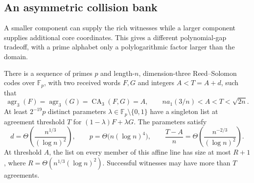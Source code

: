 \subsection{An asymmetric collision bank}
\label{subsec:asymmetric-collision-bank}

A smaller component can supply the rich witnesses while a larger component
supplies additional core coordinates.  This gives a different polynomial-gap
tradeoff, with a prime alphabet only a polylogarithmic factor larger than
the domain.

\begin{theorem}
\label{thm:asymmetric-collision-bank}
There is a sequence of primes $p$ and length-$n$, dimension-three
Reed--Solomon codes over $\mathbb F_p$, with two received words $F,G$
and integers $A<T=A+d$, such that
\[
 \operatorname{agr}_3(F)=\operatorname{agr}_3(G)
 =\operatorname{CA}_3(F,G)=A,
 \qquad n a_1(3/n)<A<T<\sqrt{2n}.
\]
At least $2^{-19}p$ distinct parameters
$\lambda\in\mathbb F_p\setminus\{0,1\}$ have a singleton list at
agreement threshold $T$ for $(1-\lambda)F+\lambda G$.  The parameters
satisfy
\[
 d=\Theta\!\left(\frac{n^{1/3}}{(\log n)^2}\right),\qquad
 p=\Theta\bigl(n(\log n)^4\bigr),\qquad
 \frac{T-A}{n}=\Theta\!\left(\frac{n^{-2/3}}{(\log n)^2}\right).
\]
At threshold $A$, the list on every member of this affine line has
size at most $R+1$, where $R=\Theta(n^{1/3}(\log n)^2)$.
Successful witnesses may have more than $T$ agreements.
\end{theorem}
